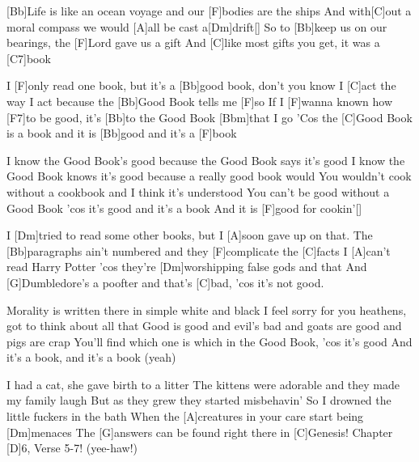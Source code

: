 


\begin{guitar}
	\small {}
	[Bb]Life is like an ocean voyage and our [F]bodies are the ships
	And with[C]out a moral compass we would [A]all be cast a[Dm]drift[]{}
	So to [Bb]keep us on our bearings, the [F]Lord gave us a gift
	And [C]like most gifts you get, it was a [C7]book
	
	I [F]only read one book, but it's a [Bb]good book, don't you know
	I [C]act the way I act because the [Bb]Good Book tells me [F]so
	If I [F]wanna known how [F7]to be good, it's [Bb]to the Good Book [Bbm]that I go
	'Cos the [C]Good Book is a book and it is [Bb]good and it's a [F]book
	
	I know the Good Book's good because the Good Book says it's good
	I know the Good Book knows it's good because a really good book would
	You wouldn't cook without a cookbook and I think it's understood
	You can't be good without a Good Book 'cos it's good and it's a book
	And it is [F]good for cookin'[]{}
	
	I [Dm]tried to read some other books, but I [A]soon gave up on that.
	The [Bb]paragraphs ain't numbered and they [F]complicate the [C]facts
	I [A]can't read Harry Potter 'cos they're [Dm]worshipping false gods and that
	And [G]Dumbledore's a poofter and that's [C]bad, 'cos it's not good.
	
	Morality is written there in simple white and black
	I feel sorry for you heathens, got to think about all that
	Good is good and evil's bad and goats are good and pigs are crap
	You'll find which one is which in the Good Book, 'cos it's good
	And it's a book, and it's a book (yeah)
	
	I had a cat, she gave birth to a litter
	The kittens were adorable and they made my family laugh
	But as they grew they started misbehavin'
	So I drowned the little fuckers in the bath
	When the [A]creatures in your care start being [Dm]menaces
	The [G]answers can be found right there in [C]Genesis!
	Chapter [D]6, Verse 5-7! (yee-haw!)
	

\end{guitar}
